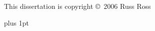 \noindent This dissertation is copyright \copyright~2006 Russ Ross

\cleardoublepage



\pagestyle{plain}
\enlargethispage*{60cm}        %

{}
\cleardoublepage

%

%        
%


%

{
  \parskip 0pt plus 1pt
  \tableofcontents
}

\cleardoublepage

%

% 

%

% 

%

% 

%

%  


